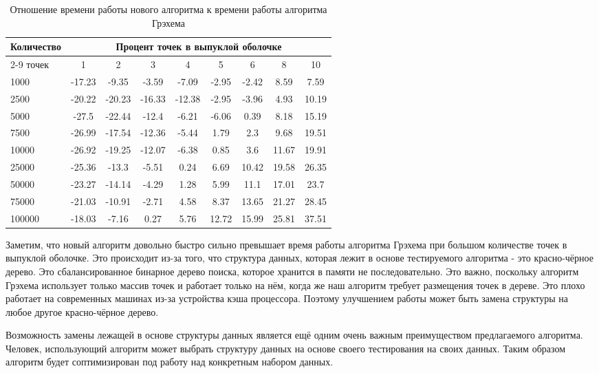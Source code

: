 \begin{table}[H]
	\centering
	\caption{Отношение времени работы нового алгоритма к времени работы алгоритма Грэхема}
	\label{table:ratio}
	\begin{tabular}{|l|c|c|c|c|c|c|c|c|}
\hline
\multirow{2}{*}{Количество} & \multicolumn{8}{c|}{Процент точек в выпуклой оболочке} \\ \cline{2-9}
точек& 1 & 2 & 3 & 4 & 5 & 6 & 8 & 10 \\ \hline
1000  &  -17.23 & -9.35  & -3.59  & -7.09  & -2.95 & -2.42 &  8.59 & 7.59  \\ \hline
2500  &  -20.22 & -20.23 & -16.33 & -12.38 & -2.95 & -3.96 &  4.93 & 10.19 \\ \hline
5000  &  -27.5  & -22.44 & -12.4  & -6.21  & -6.06 &  0.39 &  8.18 & 15.19 \\ \hline
7500  &  -26.99 & -17.54 & -12.36 & -5.44  &  1.79 &  2.3  &  9.68 & 19.51 \\ \hline
10000 &  -26.92 & -19.25 & -12.07 & -6.38  &  0.85 &  3.6  & 11.67 & 19.91 \\ \hline
25000 &  -25.36 & -13.3  & -5.51  &  0.24  &  6.69 & 10.42 & 19.58 & 26.35 \\ \hline
50000 &  -23.27 & -14.14 & -4.29  &  1.28  &  5.99 & 11.1  & 17.01 & 23.7  \\ \hline
75000 &  -21.03 & -10.91 & -2.71  &  4.58  &  8.37 & 13.65 & 21.27 & 28.45 \\ \hline
100000&  -18.03 & -7.16  &  0.27  &  5.76  & 12.72 & 15.99 & 25.81 & 37.51 \\ \hline
	\end{tabular}
\end{table}

Заметим, что новый алгоритм довольно быстро сильно превышает время работы алгоритма Грэхема при большом количестве точек в выпуклой оболочке. Это происходит из-за того, что структура данных, которая лежит в основе тестируемого алгоритма - это красно-чёрное дерево. Это сбалансированное бинарное дерево поиска, которое хранится в памяти не последовательно. Это важно, поскольку алгоритм Грэхема использует только массив точек и работает только на нём, когда же наш алгоритм требует размещения точек в дереве. Это плохо работает на современных машинах из-за устройства кэша процессора. Поэтому улучшением работы может быть замена структуры на любое другое красно-чёрное дерево.

Возможность замены лежащей в основе структуры данных является ещё одним очень важным преимуществом предлагаемого алгоритма. Человек, использующий алгоритм может выбрать структуру данных на основе своего тестирования на своих данных. Таким образом алгоритм будет соптимизирован под работу над конкретным набором данных.

